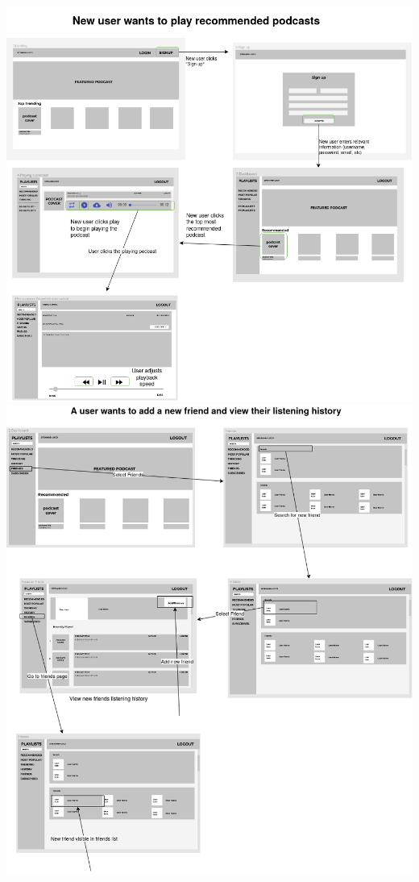 \documentclass[12pt]{article}
\begin{document}
\begin{appendices}
\begin{center}
    \newpage
    \includegraphics[width=\textwidth]{resources/playing_recommended_podcast_with_cc}
    \includegraphics[width=\textwidth]{resources/friends}

\end{center}
\end{appendices}
\end{document}
